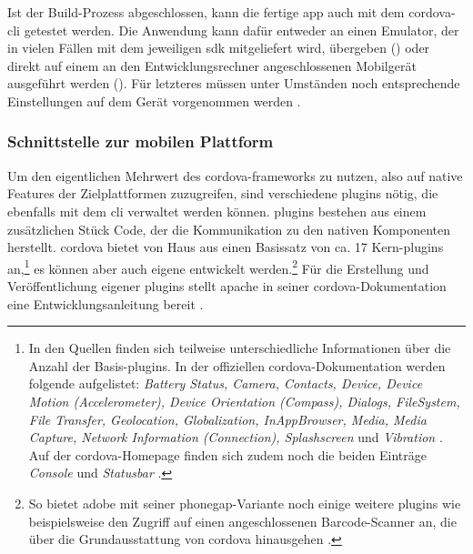 {Ist der Build-Prozess abgeschlossen, kann die fertige \gls{app} auch mit dem \gls{cordova}-\gls{cli} getestet werden. 
Die Anwendung kann dafür entweder an einen Emulator, der in vielen Fällen mit dem jeweiligen \gls{sdk} mitgeliefert wird, übergeben () oder direkt auf einem an den Entwicklungsrechner angeschlossenen Mobilgerät ausgeführt werden ().
Für letzteres müssen unter Umständen noch entsprechende Einstellungen auf dem Gerät vorgenommen werden \cite{Cordova-Docs_CLI}.



\subsubsection{Schnittstelle zur mobilen Plattform}

Um den eigentlichen Mehrwert des \gls{cordova}-\glspl{framework} zu nutzen, also auf native Features der Zielplattformen zuzugreifen, sind verschiedene \glspl{plugin} nötig, die ebenfalls mit dem \gls{cli} verwaltet werden können.
\glspl{plugin} bestehen aus einem zusätzlichen Stück Code, der die Kommunikation zu den nativen Komponenten herstellt.
\gls{cordova} bietet von Haus aus einen Basissatz von ca. 17 Kern-\glspl{plugin} an,\footnote{In den Quellen finden sich teilweise unterschiedliche Informationen über die Anzahl der Basis-\glspl{plugin}. In der offiziellen \gls{cordova}-Dokumentation werden folgende aufgelistet: \emph{Battery Status, Camera, Contacts, Device, Device Motion (Accelerometer), Device Orientation (Compass), Dialogs, FileSystem, File Transfer, Geolocation, Globalization, InAppBrowser, Media, Media Capture, Network Information (Connection), Splashscreen} und \emph{Vibration} \cite{Cordova_Docs_Plugin_APIs}. Auf der \gls{cordova}-Homepage finden sich zudem noch die beiden Einträge \emph{Console} und \emph{Statusbar} \cite{Apache_Cordova_Contribute}.} es können aber auch eigene entwickelt werden.\footnote{So bietet \zB \gls{adobe} mit seiner \gls{phonegap}-Variante noch einige weitere \glspl{plugin} wie beispielsweise den Zugriff auf einen angeschlossenen Barcode-Scanner an, die über die Grundausstattung von \gls{cordova} hinausgehen \cite{Cordova-Docs_CLI}.}
Für die Erstellung und Veröffentlichung eigener \glspl{plugin} stellt \gls{apache} in seiner \gls{cordova}-Dokumentation eine Entwicklungsanleitung bereit \cite{Cordova_Plugin_Development_Guide}.

}
